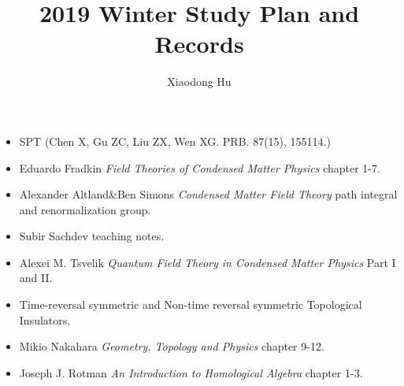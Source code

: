 \documentclass[10pt]{article}
\title{\bf 2019 Winter Study Plan and Records}
\author{Xiaodong Hu}
\date{}
\begin{document}
\maketitle

\begin{itemize}
	\color{red}
	\item SPT (Chen X, Gu ZC, Liu ZX, Wen XG. PRB. 87(15), 155114.)
	\item Eduardo Fradkin \emph{Field Theories of Condensed Matter Physics} chapter 1-7.
	\item Alexander Altland\&Ben Simons \emph{Condensed Matter Field Theory} path integral and renormalization group.
	\color{orange}
	\item Subir Sachdev teaching notes.
	\item Alexei M. Tsvelik \emph{Quantum Field Theory in Condensed Matter Physics} Part I and II.
	\color{blue}
	\item Time-reversal symmetric and Non-time reversal symmetric Topological Insulators.
	\item Mikio Nakahara \emph{Geometry, Topology and Physics} chapter 9-12.
	\item Joseph J. Rotman \emph{An Introduction to Homological Algebra} chapter 1-3. 
\end{itemize}
\end{document}

